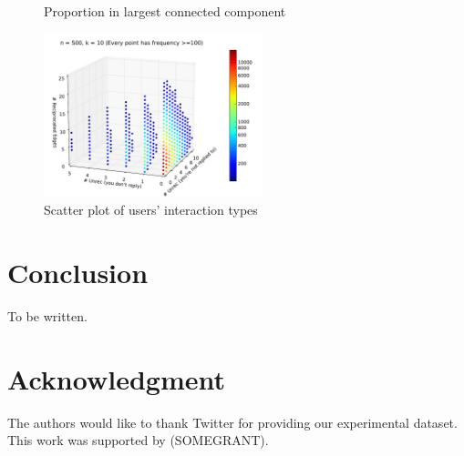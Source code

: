 \documentclass[conference]{IEEEtran}
\begin{document}
\begin{figure}[!t]
\centering
{}                
\caption{Proportion in largest connected component}
\label{fig_rur_lcc}
\end{figure}

\begin{figure}[!t]
\centering
\includegraphics[width=2.5in]{scatter3}
\caption{Scatter plot of users' interaction types}
\label{fig_rur_sca2}
\end{figure}

%
%

\section{Conclusion}
To be written.


\section*{Acknowledgment}
The authors would like to thank Twitter for providing our experimental dataset. This work was supported by (SOMEGRANT).




\end{document}
